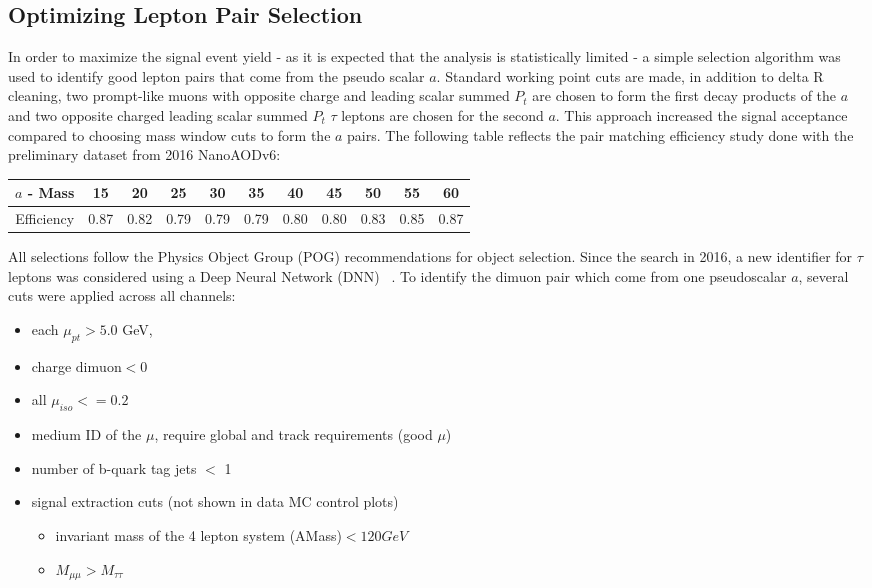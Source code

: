 \subsection{Optimizing Lepton Pair Selection}
In order to maximize the signal event yield - as it is expected that the analysis is statistically limited - a simple selection algorithm was used to identify good lepton pairs that come from the pseudo scalar $a$. Standard working point cuts are made, in addition to delta R cleaning, two prompt-like muons with opposite charge and leading scalar summed $P_t$ are chosen to form the first decay products of the $a$ and two opposite charged leading scalar summed $P_t$ $\tau$ leptons are chosen for the second $a$. This approach increased the signal acceptance compared to choosing mass window cuts to form the $a$ pairs. The following table reflects the pair matching efficiency study done with the preliminary dataset from 2016 NanoAODv6:
\begin{table}[h]
\begin{center}
    \label{tab:paireff}
\begin{tabular}{|c|c|c|c|c|c|c|c|c|c|c|}\hline
$a$ - Mass & 15     & 20    & 25    & 30    & 35    & 40    & 45    & 50    & 55    & 60 \\\hline
Efficiency & 0.87   & 0.82  &0.79   & 0.79  & 0.79  & 0.80  & 0.80  & 0.83  & 0.85  & 0.87 \\\hline 
\end{tabular}
\end{center}
\end{table}

All selections follow the Physics Object Group (POG) recommendations for object selection.
Since the search in 2016, a new identifier for $\tau$ leptons was considered using a Deep Neural Network (DNN) ~\cite{Hassanshahi:2797703}.
To identify the dimuon pair which come from one pseudoscalar $a$, several cuts were applied across all channels:
\begin{itemize}
    \item each $\mu_{pt} > 5.0$ GeV,
    \item charge $\text{dimuon} < 0$
    \item all $\mu_{iso}<=0.2$
    \item medium ID of the $\mu$, require global and track requirements (good $\mu$)
    \item number of b-quark tag jets $<$ 1 
    \item signal extraction cuts (not shown in data MC control plots)
    \begin{itemize}
    \item invariant mass of the 4 lepton system (AMass)$<120GeV$ 
    \item $M_{\mu\mu} > M_{\tau\tau}$   
    \end{itemize}
\end{itemize}


